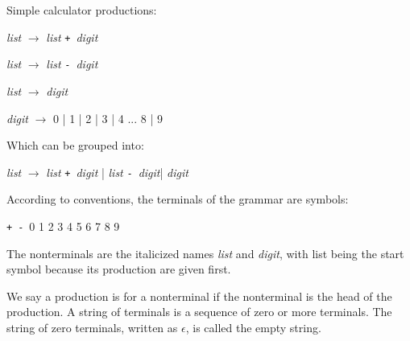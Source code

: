 \documentclass[12pt,a4paper,oneside,draft]{report}
\def\Plus{\texttt{+}}
\def\Minus{\texttt{-}}
\begin{document}
\noindent Simple calculator productions:
\begin{center}
\begin{varwidth}{\textwidth}
\item[] \emph{list} $\rightarrow$ \emph{list} \Plus\ \emph{digit}
\item[] \emph{list} $\rightarrow$ \emph{list} \Minus\ \emph{digit}
\item[] \emph{list} $\rightarrow$ \emph{digit}
\item[] \emph{digit} $\rightarrow$ 0 | 1 | 2 | 3 | 4  ... 8 | 9
\end{varwidth}
\end{center}
Which can be grouped into:
\begin{center}
\begin{varwidth}{\textwidth}
\item \emph{list} $\rightarrow$ \emph{list} \Plus\ \emph{digit} | \emph{list} \Minus\ \emph{digit}| \emph{digit}
\end{varwidth}
\end{center}
According to conventions, the terminals of the grammar are symbols:
\begin{center}
\begin{varwidth}{\textwidth}
\item \Plus\ \Minus\ 0 1 2 3 4 5 6 7 8 9
\end{varwidth}
\end{center}

The nonterminals are the italicized names \emph{list} and \emph{digit}, with list being the start symbol because its production are given first.

We say a production is for a nonterminal if the nonterminal is the head of the production. A string of terminals is a sequence of zero or more terminals. The string of zero terminals, written as $\epsilon$, is called the empty string.
\end{document}
